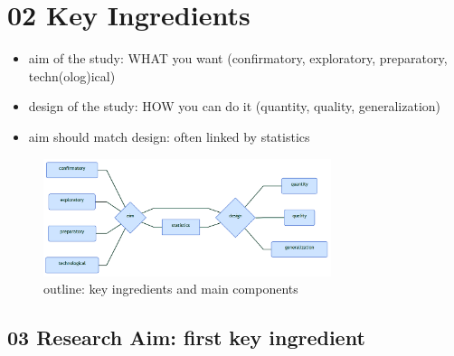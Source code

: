 \documentclass[
]{article}
\providecommand{\tightlist}{%
  \setlength{\itemsep}{0pt}\setlength{\parskip}{0pt}}
\begin{document}
\hypertarget{key-ingredients}{%
\section{02 Key Ingredients}\label{key-ingredients}}

\begin{itemize}
\tightlist
\item
  aim of the study: WHAT you want (confirmatory, exploratory,
  preparatory, techn(olog)ical)
\item
  design of the study: HOW you can do it (quantity, quality,
  generalization)
\item
  aim should match design: often linked by statistics \\
\end{itemize}

\begin{figure}
\centering
\includegraphics[width=0.75\textwidth,height=\textheight]{diagrammeR.png}
\caption{outline: key ingredients and main components}
\end{figure}

\newpage

\hypertarget{research-aim-first-key-ingredient}{%
\subsection{03 Research Aim: first key
ingredient}\label{research-aim-first-key-ingredient}}
\end{document}

